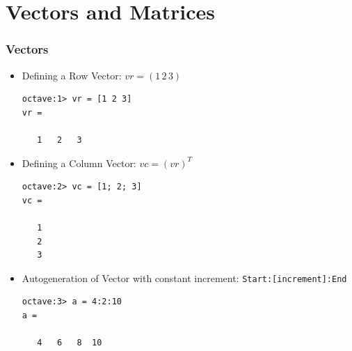\documentclass[slidestop,mathserif,compress,xcolor=svgnames]{beamer}
\begin{document}
\section{Vectors and Matrices}
\begin{frame}[fragile]
  \frametitle{\small Vectors}
  \begin{itemize}
    \item Defining a Row Vector: $vr = (1\,2\,3)$
    \begin{verbatim}
octave:1> vr = [1 2 3]
vr =

   1   2   3
    \end{verbatim}
    \item Defining a Column Vector: $vc = (vr)^T$ 
    \begin{verbatim}
octave:2> vc = [1; 2; 3]
vc =

   1
   2
   3
    \end{verbatim}
    \item Autogeneration of Vector with constant increment: \texttt{Start:[increment]:End}
    \begin{verbatim}
octave:3> a = 4:2:10
a =

   4   6   8  10
    \end{verbatim}
  \end{itemize}
\end{frame}
\end{document}
